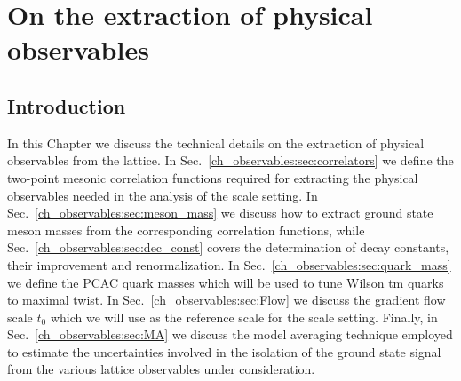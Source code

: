 \chapter{On the extraction of physical observables}%


\label{ch_observables}


\section{Introduction}
\label{ch_observables:sec:general}

In this Chapter we discuss the technical details on the extraction of physical observables from the lattice. In Sec.~\ref{ch_observables:sec:correlators} we define the two-point mesonic correlation functions required for extracting the physical observables needed in the analysis of the scale setting. In Sec.~\ref{ch_observables:sec:meson_mass} we discuss how to extract ground state meson masses from the corresponding correlation functions, while Sec.~\ref{ch_observables:sec:dec_const} covers the determination of decay constants, their improvement and renormalization. In  Sec.~\ref{ch_observables:sec:quark_mass} we define the PCAC quark masses which will be used to tune Wilson tm quarks to maximal twist. In Sec.~\ref{ch_observables:sec:Flow} we discuss the gradient flow scale $t_0$ which we will use as the reference scale for the scale setting. Finally, in Sec.~\ref{ch_observables:sec:MA} we discuss the model averaging technique employed to estimate the uncertainties involved in the isolation of the ground state signal from the various  lattice observables under consideration.


